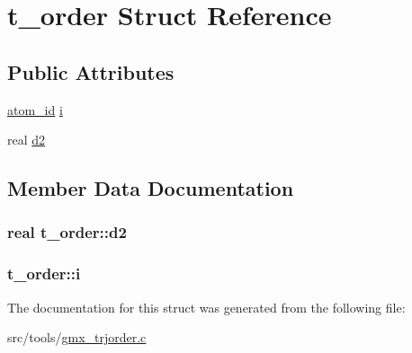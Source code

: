 \hypertarget{structt__order}{\section{t\-\_\-order \-Struct \-Reference}
\label{structt__order}
}
\subsection*{\-Public \-Attributes}
\begin{DoxyCompactItemize}
\item 
\hyperlink{include_2types_2simple_8h_ad3f47cdb48677e516e2049719612c737}{atom\-\_\-id} \hyperlink{structt__order_a75c10d73cbfd81ab01078accfb1b266a}{i}
\item 
real \hyperlink{structt__order_a8da0d4f9646ec0e22b3de5b50cee6da2}{d2}
\end{DoxyCompactItemize}


\subsection{\-Member \-Data \-Documentation}
\hypertarget{structt__order_a8da0d4f9646ec0e22b3de5b50cee6da2}{
\subsubsection[{d2}]{\setlength{\rightskip}{0pt plus 5cm}real {\bf t\-\_\-order\-::d2}}}\label{structt__order_a8da0d4f9646ec0e22b3de5b50cee6da2}
\hypertarget{structt__order_a75c10d73cbfd81ab01078accfb1b266a}{
\subsubsection[{i}]{ {\bf t\-\_\-order\-::i}}}\label{structt__order_a75c10d73cbfd81ab01078accfb1b266a}


\-The documentation for this struct was generated from the following file\-:\begin{DoxyCompactItemize}
\item 
src/tools/\hyperlink{gmx__trjorder_8c}{gmx\-\_\-trjorder.\-c}\end{DoxyCompactItemize}

